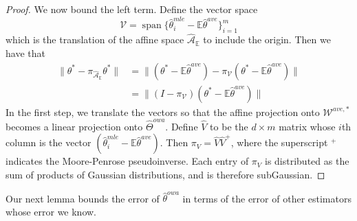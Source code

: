 \documentclass[twoside]{article}
\DeclareMathOperator*{\vecspan}{span}
\newcommand{\matV}{\hat V}
\newcommand{\W}{{\hat \Theta^{\textit{owa}}}}
\newcommand{\Waff}{\mathcal{\hat A}}
\newcommand{\WaffE}{{\mathcal{\hat A}_\E}}
\newcommand{\Wtave}{{\mathcal{W}^{ave,*}}}
\newcommand{\V}{\mathcal{V}}
\newcommand{\E}{\mathbb{E}}
\newcommand{\w}{\theta}
\newcommand{\wowa}{\hat\w^{owa}}
\newcommand{\wave}{\hat\w^{ave}}
\newcommand{\wtave}{\E\hat\w^{ave}}
\newcommand{\wmle}{\hat\w^{mle}}
\newcommand{\wstar}{{\w^{*}}}
\newcommand{\ltwo}[1]{{\lVert {#1} \rVert}}
\newcommand{\proj}[1]{\pi_{{#1}}}
\begin{document}
\begin{proof}
{%

We now bound the left term.
Define the vector space
\begin{equation}
\V=\vecspan \{\wmle_i - \wtave\}_{i=1}^m
\end{equation}
which is the translation of the affine space $\WaffE$ to include the origin.
Then we have that
\begin{align}
\ltwo{\wstar-\proj\WaffE\wstar}
&=
\ltwo{(\wstar-\wtave)-\proj\V(\wstar-\wtave)}
\\&=
\ltwo{(I-\proj\V)(\wstar-\wtave)}
\end{align}
In the first step, we translate the vectors so that the affine projection onto $\Wtave$ becomes a linear projection onto $\W$.
Define $\matV$ to be the $d \times m$ matrix whose $i$th column is the vector $(\wmle_i - \E\wave)$.
Then $\proj{V} = \matV\matV^+$, where the superscript $^+$ indicates the Moore-Penrose pseudoinverse.
Each entry of $\proj{V}$ is distributed as the sum of products of Gaussian distributions,
and is therefore subGaussian.
}
\end{proof}


Our next lemma bounds the error of $\wowa$ in terms of the error of other estimators whose error we know.
\end{document}
